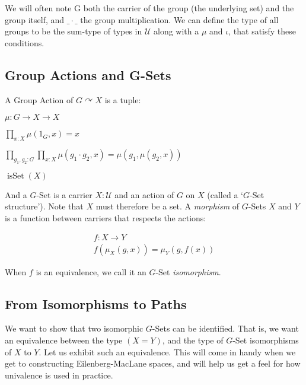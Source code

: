 \documentclass{article}
\DeclareMathOperator{\isset}{isSet}
\begin{document}
We will often note G both the carrier of the group (the underlying set) and the group itself, and $\_\cdot\_$ the group multiplication. We can define the type of all groups to be the sum-type of types in $\mathcal{U}$ along with a $\mu$ and $\iota$, that satisfy these conditions.

\subsection{Group Actions and G-Sets}

A Group Action of $G \curvearrowright X$ is a tuple:

\begin{itemize}
\begin{minipage}[c][3cm]{0.3\linewidth}
        \item $\mu : G \to X \to X$
\end{minipage}
\begin{minipage}[c][3cm]{0.6\linewidth}
        \item $\displaystyle\prod_{x : X} \mu(1_{G}, x) = x $
        \item $\displaystyle\prod_{g_1, g_2 : G}\prod_{x : X} \mu(g_1 \cdot g_2, x) = \mu(g_1, \mu(g_2,x)) $
        \item $\isset(X)$
\end{minipage}
\end{itemize}

And a $G$-Set is a carrier $X : \mathcal{U}$ and an action of $G$ on $X$ (called a `$G$-Set structure'). Note that $X$ must therefore be a set. A \emph{morphism} of $G$-Sets $X$ and $Y$ is a function between carriers that respects the actions:

\begin{gather*}
f : X \to Y \\
f(\mu_{X}(g,x)) = \mu_{Y}(g,f(x))
\end{gather*}

When $f$ is an equivalence, we call it an $G$-Set \emph{isomorphism}.

\subsection{From Isomorphisms to Paths}

We want to show that two isomorphic $G$-Sets can be identified. That is, we want an equivalence between the type $(X = Y)$, and the type of $G$-Set isomorphisms of $X$ to $Y$. Let us exhibit such an equivalence. This will come in handy when we get to constructing Eilenberg-MacLane spaces, and will help us get a feel for how univalence is used in practice.
\end{document}
